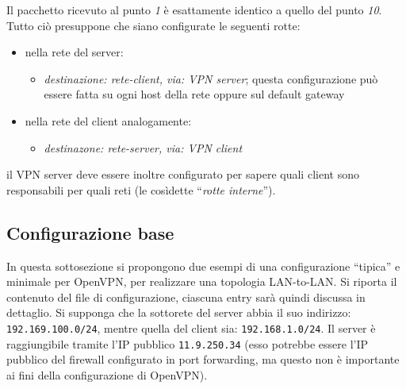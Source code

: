 Il pacchetto ricevuto al punto \textit{1} è esattamente identico a quello del
punto \textit{10}.
Tutto ciò presuppone che siano configurate le seguenti rotte:
\begin{itemize}
	\item nella rete del server:
	      \begin{itemize}
	      	\item \textit{destinazione: rete-client, via: VPN server}; questa configurazione
	      	      può essere fatta su ogni host della rete oppure sul default gateway
	      \end{itemize}
	\item nella rete del client analogamente:
	      \begin{itemize}
	      	\item \textit{destinazone: rete-server, via: VPN client}
	      \end{itemize}
\end{itemize}
il VPN server deve essere inoltre configurato per sapere quali client sono responsabili
per quali reti (le cosìdette ``\textit{rotte interne}'').


\subsection{Configurazione base}
In questa sottosezione si propongono due esempi di una configurazione ``tipica''
e minimale per OpenVPN, per realizzare una topologia LAN-to-LAN. Si riporta il
contenuto del file di configurazione, ciascuna entry sarà quindi discussa in dettaglio.
Si supponga che la sottorete del server abbia il suo indirizzo: \texttt{192.169.100.0/24},
mentre quella del client sia: \texttt{192.168.1.0/24}. Il server è raggiungibile
tramite l'IP pubblico \texttt{11.9.250.34} (esso potrebbe essere l'IP pubblico del firewall
configurato in port forwarding, ma questo non è importante ai fini della configurazione
di OpenVPN).

